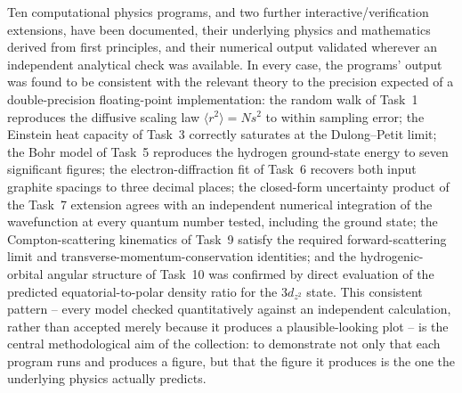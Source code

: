 \documentclass[11pt]{article}
\begin{document}
Ten computational physics programs, and two further interactive/verification extensions, have been documented, their underlying physics and mathematics derived from first principles, and their numerical output validated wherever an independent analytical check was available. In every case, the programs' output was found to be consistent with the relevant theory to the precision expected of a double-precision floating-point implementation: the random walk of Task~1 reproduces the diffusive scaling law $\langle r^2\rangle=Ns^2$ to within sampling error; the Einstein heat capacity of Task~3 correctly saturates at the Dulong--Petit limit; the Bohr model of Task~5 reproduces the hydrogen ground-state energy to seven significant figures; the electron-diffraction fit of Task~6 recovers both input graphite spacings to three decimal places; the closed-form uncertainty product of the Task~7 extension agrees with an independent numerical integration of the wavefunction at every quantum number tested, including the ground state; the Compton-scattering kinematics of Task~9 satisfy the required forward-scattering limit and transverse-momentum-conservation identities; and the hydrogenic-orbital angular structure of Task~10 was confirmed by direct evaluation of the predicted equatorial-to-polar density ratio for the $3d_{z^2}$ state. This consistent pattern -- every model checked quantitatively against an independent calculation, rather than accepted merely because it produces a plausible-looking plot -- is the central methodological aim of the collection: to demonstrate not only that each program runs and produces a figure, but that the figure it produces is the one the underlying physics actually predicts.
\end{document}
